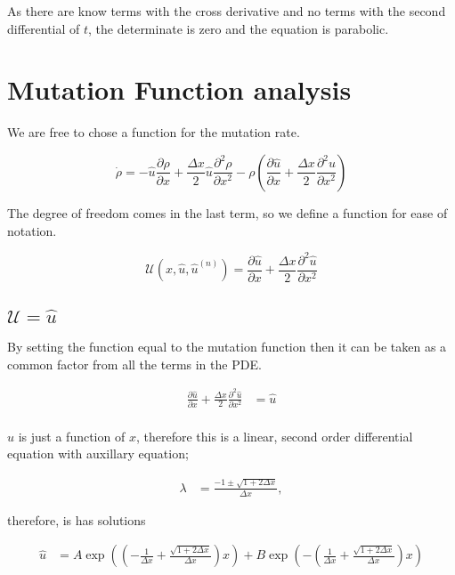 \documentclass[a4paper]{article}
\begin{document}
As there are know terms with the cross derivative and no terms with the second differential of $t$, the determinate is zero and the equation is parabolic. 
 
\newpage 
 
\section{Mutation Function analysis}

We are free to chose a function for the mutation rate. 

\begin{equation}
\dot{\rho} = - \hat{u} \frac{\partial \rho}{\partial x} + \frac{\Delta x}{2} \hat{u} \frac{\partial ^2 \rho}{\partial x ^2} - \rho \left( \frac{\partial \hat{u}}{\partial x} + \frac{\Delta x }{2} \frac{\partial ^2 \hat{u}}{\partial x^2} \right) 
\end{equation}

The degree of freedom comes in the last term, so we define a function for ease of notation. 

\begin{equation}
\mathcal{U} (x, \hat{u}, \hat{u} ^{(n)} ) = \frac{\partial \hat{u}}{\partial x} + \frac{\Delta x}{2} \frac{\partial ^2 \hat{u}}{\partial x^2}
\end{equation}

\subsection{$\mathcal{U} = \hat{u}$}

By setting the function equal to the mutation function then it can be taken as a common factor from all the terms in the PDE. 

\begin{align*}
 \frac{\partial \hat{u}}{\partial x} + \frac{\Delta x}{2} \frac{\partial ^2 \hat{u}}{\partial x^2} & = \hat{u} \\ 
\end{align*}

$\hat{u}$ is just a function of $x$, therefore this is a linear, second order differential equation with auxillary equation; 

\begin{align*}
\lambda & = \frac{- 1 \pm \sqrt{1 + 2 \Delta x}}{\Delta x},
\end{align*}

therefore, is has solutions 

\begin{align*}
\hat{u} & = A \exp \left( \left( - \frac{1}{\Delta x} + \frac{\sqrt{1 + 2 \Delta x}}{\Delta x} \right) x \right) + B \exp \left( - \left( \frac{1}{\Delta x} + \frac{\sqrt{1 + 2 \Delta x}}{\Delta x} \right) x \right)
\end{align*}
\end{document}
